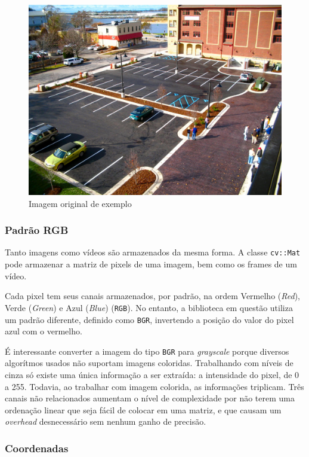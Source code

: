 \documentclass[10pt,twocolumn,letterpaper]{article}
\begin{document}
\begin{figure}[!htb]
\centering
\includegraphics[width=\columnwidth]{estacionamento.jpg}
\caption{Imagem original de exemplo}
\label{fig:original}
\end{figure}


\subsubsection{Padrão RGB}

	Tanto imagens como vídeos são armazenados da mesma forma. A classe
\verb'cv::Mat' pode armazenar a matriz de pixels de uma imagem, bem como os
frames de um vídeo.

	Cada pixel tem seus canais armazenados, por padrão, na ordem Vermelho ({\em Red}),
Verde ({\em Green}) e Azul ({\em Blue}) (\verb'RGB'). No entanto, a biblioteca em questão
utiliza um padrão diferente, definido como \verb'BGR', invertendo a posição do valor do
pixel azul com o vermelho.

	É interessante converter a imagem do tipo \verb'BGR' para \emph{grayscale} porque
diversos algorítmos usados não suportam imagens coloridas.
Trabalhando com níveis de cinza só existe uma única informação
a ser extraída: a intensidade do pixel, de 0 a 255. Todavia, ao trabalhar com imagem
colorida, as informações triplicam. Três canais não relacionados aumentam o nível de
complexidade por não terem uma ordenação linear que seja fácil de colocar em uma matriz,
e que causam um \emph{overhead} desnecessário sem nenhum ganho de precisão.


\subsubsection{Coordenadas}
\end{document}
